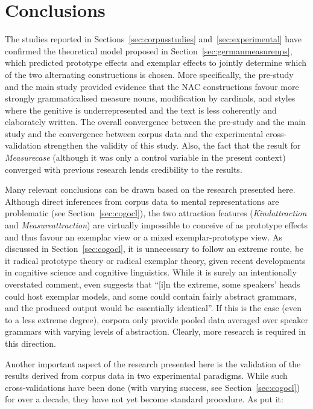 \section{Conclusions}
\label{sec:conclusion}

The studies reported in Sections~\ref{sec:corpusstudies} and~\ref{sec:experimental} have confirmed the theoretical model proposed in Section~\ref{sec:germanmeasurenps}, which predicted prototype effects and exemplar effects to jointly determine which of the two alternating constructions is chosen.
More specifically, the pre-study and the main study provided evidence that the NAC constructions favour more strongly grammaticalised measure nouns, modification by cardinals, and styles where the genitive is underrepresented and the text is less coherently and elaborately written.
The overall convergence between the pre-study and the main study and the convergence between corpus data and the experimental cross-validation strengthen the validity of this study.
Also, the fact that the result for \textit{Measurecase} (although it was only a control variable in the present context) converged with previous research \citep{Zimmer2015} lends credibility to the results.

Many relevant conclusions can be drawn based on the research presented here.
Although direct inferences from corpus data to mental representations are problematic (see Section~\ref{sec:cogocl}), the two attraction features (\textit{Kindattraction} and \textit{Measureattraction}) are virtually impossible to conceive of as prototype effects and thus favour an exemplar view or a mixed exemplar-prototype view.
As discussed in Section~\ref{sec:cogocl}, it is unnecessary to follow an extreme route, be it radical prototype theory or radical exemplar theory, given recent developments in cognitive science and cognitive linguistics.
While it is surely an intentionally overstated comment, \citet[15]{Kapatsinski2014} even suggests that ``[i]n the extreme, some speakers’ heads could host exemplar models, and some could contain fairly abstract grammars, and the produced output would be essentially identical''.
If this is the case (even to a less extreme degree), corpora only provide pooled data averaged over speaker grammars with varying levels of abstraction.
Clearly, more research is required in this direction.

Another important aspect of the research presented here is the validation of the results derived from corpus data in two experimental paradigms.
While such cross-validations have been done (with varying success, see Section~\ref{sec:cogocl}) for over a decade, they have not yet become standard procedure.
As \citet[3--4]{DivjakEa2016a} put it:


